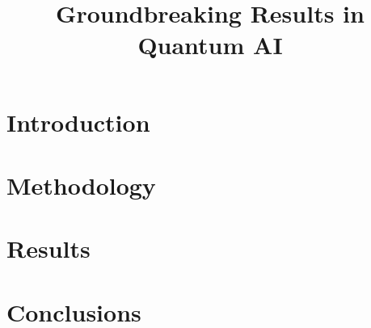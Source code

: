 \documentclass[sigplan,screen]{acmart}
\begin{document}
\title{Groundbreaking Results in Quantum AI}

\begin{abstract}
\lipsum[1-1]
\end{abstract}


\maketitle

\section{Introduction}
\lipsum[2-2]

\section{Methodology}
\lipsum[3-7]

\section{Results}
\lipsum[8-9]

\section{Conclusions}
\lipsum[10]
\end{document}
